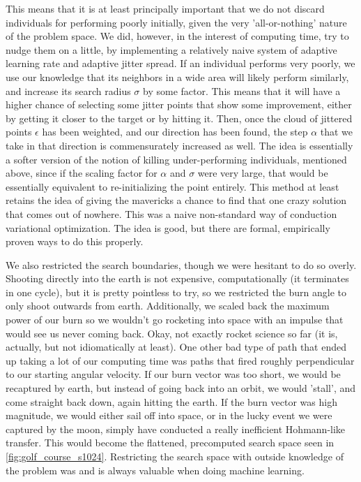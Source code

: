 This means that it is at least principally important that we do not discard individuals for performing poorly initially, given the very 'all-or-nothing' nature of the problem space. We did, however, in the interest of computing time, try to nudge them on a little, by implementing a relatively naive system of adaptive learning rate and adaptive jitter spread. If an individual performs very poorly, we use our knowledge that its neighbors in a wide area will likely perform similarly, and increase its search radius $\sigma$ by some factor. This means that it will have a higher chance of selecting some jitter points that show some improvement, either by getting it closer to the target or by hitting it. Then, once the cloud of jittered points $\epsilon$ has been weighted, and our direction has been found, the step $\alpha$ that we take in that direction is commensurately increased as well. The idea is essentially a softer version of the notion of killing under-performing individuals, mentioned above, since if the scaling factor for $\alpha$ and $\sigma$ were very large, that would be essentially equivalent to re-initializing the point entirely. This method at least retains the idea of giving the mavericks a chance to find that one crazy solution that comes out of nowhere. This was a naive non-standard way of conduction variational optimization. The idea is good, but there are formal, empirically proven ways to do this properly.

We also restricted the search boundaries, though we were hesitant to do so overly. Shooting directly into the earth is not expensive, computationally (it terminates in one cycle), but it is pretty pointless to try, so we restricted the burn angle to only shoot outwards from earth. Additionally, we scaled back the maximum power of our burn so we wouldn't go rocketing into space with an impulse that would see us never coming back. Okay, not exactly rocket science so far (it is, actually, but not idiomatically at least). One other bad type of path that ended up taking a lot of our computing time was paths that fired roughly perpendicular to our starting angular velocity. If our burn vector was too short, we would be recaptured by earth, but instead of going back into an orbit, we would 'stall', and come straight back down, again hitting the earth. If the burn vector was high magnitude, we would either sail off into space, or in the lucky event we were captured by the moon, simply have conducted a really inefficient Hohmann-like transfer. This would become the flattened, precomputed search space seen in \cref{fig:golf_course_s1024}. Restricting the search space with outside knowledge of the problem was and is always valuable when doing machine learning.

